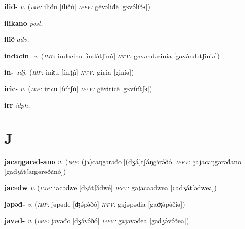 \newentry
\headword\textbf{iliđ-}
\ipa{[ilíð-]}
\synpos\textit{v.} 
\imperative(\textit {\textsc{imp:}} iliđu [ílíðú] 
\imperfective\textit{\textsc{ipfv:}} gëvəliđë [gɜvə́líðɜ])

\newentry
\headword\textbf{ilikano}
\ipa{[ilikano]}
\synpos\textit{post.} 

\newentry
\headword\textbf{illë}
\ipa{[ílːɜ]}
\synpos\textit{adv.} 

\newentry
\headword\textbf{indəcin-}
\ipa{[índətʃin-]}
\synpos\textit{v.} 
\imperative(\textit {\textsc{imp:}} indəcinu [índə́tʃínú] 
\imperfective\textit{\textsc{ipfv:}} gavəndəcinia [gavə́ndətʃiniə])

\newentry
\headword\textbf{in-}
\ipa{[ín-]}
\synpos\textit{adj.} 
\imperative(\textit {\textsc{imp:}} init̪u [ínít̪ú] 
\imperfective\textit{\textsc{ipfv:}} ginia [giníə])

\newentry
\headword\textbf{iric-}
\ipa{[iɾíc-]}
\synpos\textit{v.} 
\imperative(\textit {\textsc{imp:}} iricu [íɾítʃú] 
\imperfective\textit{\textsc{ipfv:}} gëviricë [gɜvíɾítʃɜ])


\newentry
\headword\textbf{irr}  
\ipa{[irrrr]}
\synpos\textit{idph.} 


\section*{J}\label{J}

\newentry
\headword\textbf{jacaŋgərəđ-ano}
\synpos\textit{v.} 
\imperative(\textit {\textsc{imp:}} (ja)caŋgərəđo [(dʒá)tʃáŋgə́rə́ðó] 
\imperfective\textit{\textsc{ipfv:}} gajacaŋgərəđano [gadʒátʃaŋgərəðánó])


\newentry
\headword\textbf{jacədw}
\synpos\textit{v.} 
\imperative(\textit {\textsc{imp:}} jacədwe [dʒátʃə́dwé] 
\imperfective\textit{\textsc{ipfv:}} gajacaədwea [ɡadʒátʃədwea])

\newentry
\headword\textbf{jəpəđ-}
\ipa{[ʤə́pə́ð-]}
\synpos\textit{v.} 
\imperative(\textit {\textsc{imp:}} jəpəđo [ʤə́pə́ðó] 
\imperfective\textit{\textsc{ipfv:}} gajəpəđia [gaʤə́pə́ðiə])

\newentry
\headword\textbf{jəvəđ-}
\ipa{[dʒə́və́ð-]}
\synpos\textit{v.} 
\imperative(\textit {\textsc{imp:}} jəvəđo [dʒə́və́ðó] 
\imperfective\textit{\textsc{ipfv:}} gajəvəđea [gadʒə́və́ðea])

